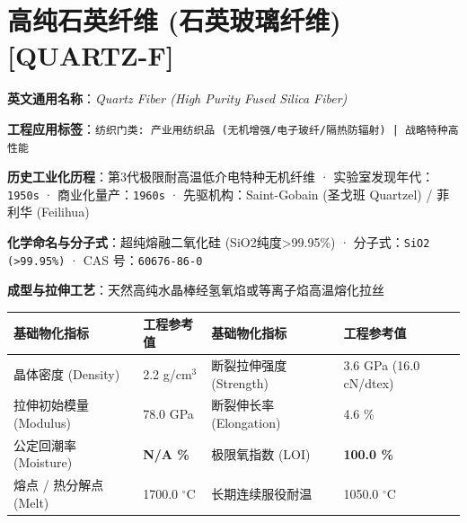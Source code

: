 \documentclass[11pt,openright,twoside,UTF8]{ctexbook}
\begin{document}
\section{高纯石英纤维 (石英玻璃纤维) [QUARTZ-F]}
\label{sec:quartz-f}

\noindent\textbf{英文通用名称}：\textit{Quartz Fiber (High Purity Fused Silica Fiber)}\par
\noindent\textbf{工程应用标签}：\texttt{纺织门类: 产业用纺织品 (无机增强/电子玻纤/隔热防辐射) | 战略特种高性能}\par
\noindent\textbf{历史工业化历程}：第3代极限耐高温低介电特种无机纤维 · 实验室发现年代：\texttt{1950s} · 商业化量产：\texttt{1960s} · 先驱机构：Saint-Gobain (圣戈班 Quartzel) / 菲利华 (Feilihua)\par
\noindent\textbf{化学命名与分子式}：超纯熔融二氧化硅 (SiO2纯度\textgreater{}99.95\%) · 分子式：\texttt{SiO2 (\textgreater{}99.95\%)} · CAS 号：\texttt{60676-86-0}\par
\noindent\textbf{成型与拉伸工艺}：天然高纯水晶棒经氢氧焰或等离子焰高温熔化拉丝\par

\vspace{0.15cm}
\begin{center}
\small
\begin{tabularx}{\textwidth}{p{3.8cm}Xp{3.8cm}X}
\toprule
\textbf{基础物化指标} & \textbf{工程参考值} & \textbf{基础物化指标} & \textbf{工程参考值} \\
\midrule
晶体密度 (Density) & 2.2 g/cm$^3$ & 断裂拉伸强度 (Strength) & 3.6 GPa (16.0 cN/dtex) \\
拉伸初始模量 (Modulus) & 78.0 GPa & 断裂伸长率 (Elongation) & 4.6 \% \\
公定回潮率 (Moisture) & \textbf{N/A \%} & 极限氧指数 (LOI) & \textbf{100.0 \%} \\
熔点 / 热分解点 (Melt) & 1700.0 $^\circ\mathrm{C}$ & 长期连续服役耐温 & 1050.0 $^\circ\mathrm{C}$ \\
\bottomrule
\end{tabularx}
\end{center}
\vspace{0.15cm}
\end{document}
